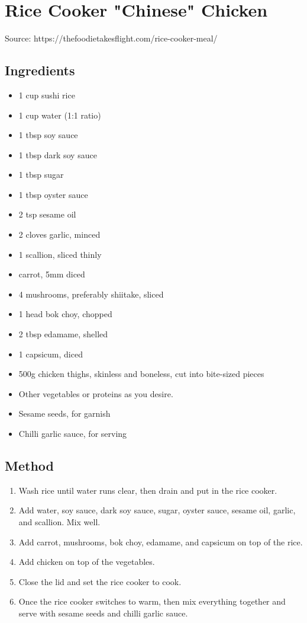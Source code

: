 \clearpage
\section{Rice Cooker "Chinese" Chicken}


Source: https://thefoodietakesflight.com/rice-cooker-meal/

\subsection{Ingredients}

\begin{itemize}
    \item 1 cup sushi rice
    \item 1 cup water (1:1 ratio)
    \item 1 tbsp soy sauce
    \item 1 tbsp dark soy sauce
    \item 1 tbsp sugar
    \item 1 tbsp oyster sauce
    \item 2 tsp sesame oil
    \item 2 cloves garlic, minced
    \item 1 scallion, sliced thinly
    \item {} carrot, 5mm diced
    \item 4 mushrooms, preferably shiitake, sliced
    \item 1 head bok choy, chopped
    \item 2 tbsp edamame, shelled
    \item 1 capsicum, diced
    \item 500g chicken thighs, skinless and boneless, cut into bite-sized pieces
    \item Other vegetables or proteins as you desire.
    \item Sesame seeds, for garnish
    \item Chilli garlic sauce, for serving
\end{itemize}

\subsection{Method}

\begin{enumerate}
    \item Wash rice until water runs clear, then drain and put in the rice cooker.
    \item Add water, soy sauce, dark soy sauce, sugar, oyster sauce, sesame oil, garlic, and scallion. Mix well.
    \item Add carrot, mushrooms, bok choy, edamame, and capsicum on top of the rice.
    \item Add chicken on top of the vegetables.
    \item Close the lid and set the rice cooker to cook.
    \item Once the rice cooker switches to warm, then mix everything together and serve with sesame seeds and chilli garlic sauce.
\end{enumerate}
